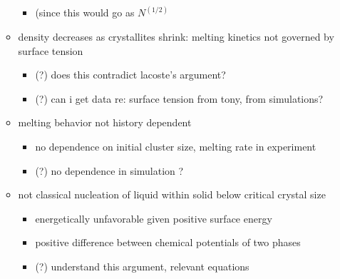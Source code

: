 \documentclass{umthesis}          %
\begin{document}
\begin{itemize}
\begin{itemize}
\begin{itemize}

\item (since this would go as $N^(1/2)$\\
\label{sec-3.1.2.4.1.1}

\end{itemize} %

\item density decreases as crystallites shrink: melting kinetics not governed by surface tension\\
\label{sec-3.1.2.4.2}

\begin{itemize}

\item (?) does this contradict lacoste's argument?\\
\label{sec-3.1.2.4.2.1}


\item (?) can i get data re: surface tension from tony, from simulations?\\
\label{sec-3.1.2.4.2.2}

\end{itemize} %

\item melting behavior not history dependent\\
\label{sec-3.1.2.4.3}

\begin{itemize}

\item no dependence on initial cluster size, melting rate in experiment\\
\label{sec-3.1.2.4.3.1}


\item (?) no dependence in simulation ?\\
\label{sec-3.1.2.4.3.2}

\end{itemize} %

\item not classical nucleation of liquid within solid below critical crystal size\\
\label{sec-3.1.2.4.4}

\begin{itemize}

\item energetically unfavorable given positive surface energy\\
\label{sec-3.1.2.4.4.1}


\item positive difference between chemical potentials of two phases\\
\label{sec-3.1.2.4.4.2}


\item (?) understand this argument, relevant equations\\
\label{sec-3.1.2.4.4.3}

\end{itemize} %
\end{itemize} %
\end{itemize} %
\end{document}
